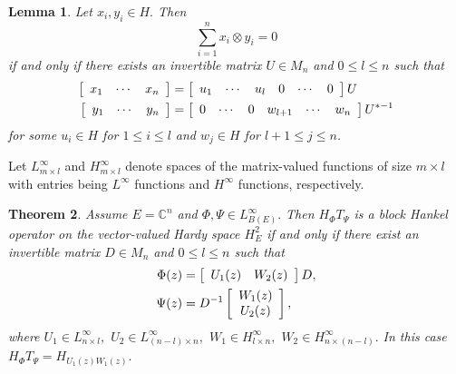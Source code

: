 \documentclass{article}%
\newtheorem{theorem}{Theorem}[section]
\newtheorem{lemma}[theorem]{Lemma}
\begin{document}
\begin{lemma}
\label{xy1}Let $x_{i},y_{i}\in H.$ Then
\[
\sum_{i=1}^{n}x_{i}\otimes y_{i}=0
\]
if and only if there exists an invertible matrix $U\in M_{n}$ and $0\leq l\leq
n$ such that
\begin{align*}
\left[
\begin{array}
[c]{ccc}%
x_{1} & \cdots & x_{n}%
\end{array}
\right]   &  =\left[
\begin{array}
[c]{cccccc}%
u_{1} & \cdots & u_{l} & 0 & \cdots & 0
\end{array}
\right]  U\\
\left[
\begin{array}
[c]{ccc}%
y_{1} & \cdots & y_{n}%
\end{array}
\right]   &  =\left[
\begin{array}
[c]{cccccc}%
0 & \cdots & 0 & w_{l+1} & \cdots & w_{n}%
\end{array}
\right]  U^{\ast-1}%
\end{align*}
for some $u_{i}\in H$ for $1\leq i\leq l$ and $w_{j}\in H$ for $l+1\leq j\leq
n$.
\end{lemma}

Let $L_{m\times l}^{\infty}$ and $H_{m\times l}^{\infty}$ denote spaces of the
matrix-valued functions of size $m\times l$ with entries being $L^{\infty}$
functions and $H^{\infty}$ functions, respectively.

\begin{theorem}
\label{Theorem Huw} Assume $E=\mathbb{C}^{n}$ and $\Phi,\Psi\in L_{B(E)}%
^{\infty}.$ Then $H_{\Phi}T_{\Psi}$ is a block Hankel operator on the
vector-valued Hardy space $H_{E}^{2}$ if and only if there exist an invertible
matrix $D\in M_{n}$ and $0\leq l\leq n$ such that
\begin{align*}
\Phi(z)  &  =\left[
\begin{array}
[c]{cc}%
U_{1}(z) & W_{2}(z)
\end{array}
\right]  D,\\
\Psi(z)  &  =D^{-1}\left[
\begin{array}
[c]{c}%
W_{1}(z)\\
U_{2}(z)
\end{array}
\right]  ,
\end{align*}
where $U_{1}\in L_{n\times l}^{\infty},$ $U_{2}\in L_{(n-l)\times n}^{\infty
},$ $W_{1}\in H_{l\times n}^{\infty},$ $W_{2}\in H_{n\times(n-l)}^{\infty}.$
In this case $H_{\Phi}T_{\Psi}=H_{U_{1}(z)W_{1}(z)}.$
\end{theorem}
\end{document}
